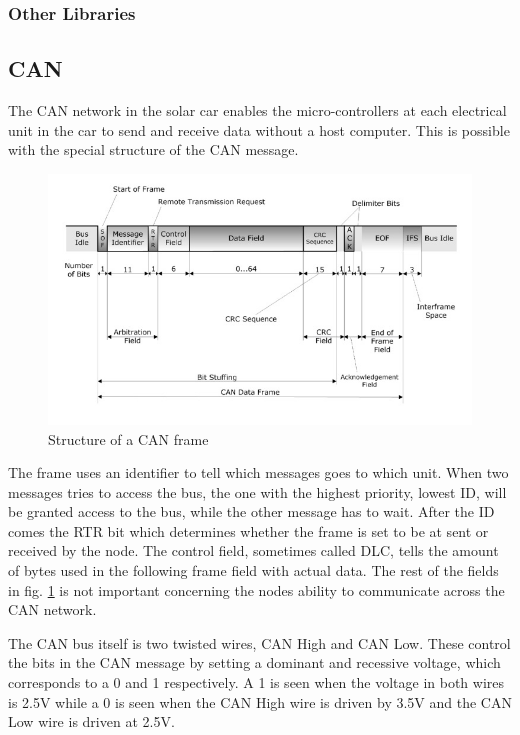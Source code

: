 \documentclass[conference]{IEEEtran}
\begin{document}
\subsubsection{Other Libraries}

\subsection{CAN} %
The CAN network in the solar car enables the micro-controllers at each electrical unit in the car to send and receive data without a host computer. This is possible with the special structure of the CAN message.

\begin{figure}[h]
    \includegraphics[scale=0.35]{documentation/images/detailed-can-data-frame-architecture.jpg}
    \caption{Structure of a CAN frame}
    \label{fig:CANframe}
\end{figure}

The frame uses an identifier to tell which messages goes to which unit. When two messages tries to access the bus, the one with the highest priority, lowest ID, will be granted access to the bus, while the other message has to wait. After the ID comes the RTR bit which determines whether the frame is set to be at sent or received by the node. The control field, sometimes called DLC, tells the amount of bytes used in the following frame field with actual data. The rest of the fields in fig. \ref{fig:CANframe} is not important concerning the nodes ability to communicate across the CAN network.

The CAN bus itself is two twisted wires, CAN High and CAN Low. These control the bits in the CAN message by setting a dominant and recessive voltage, which corresponds to a 0 and 1 respectively. A 1 is seen when the voltage in both wires is 2.5V while a 0 is seen when the CAN High wire is driven by 3.5V and the CAN Low wire is driven at 2.5V. 
\end{document}

